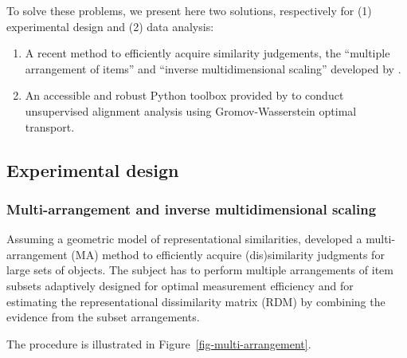 \documentclass[
  authoryear]{elsarticle}
\providecommand{\tightlist}{%
  \setlength{\itemsep}{0pt}\setlength{\parskip}{0pt}}\usepackage{longtable,booktabs,array}
\begin{document}
To solve these problems, we present here two solutions, respectively for
(1) experimental design and (2) data analysis:

\begin{enumerate}
\def\labelenumi{\arabic{enumi}.}
\tightlist
\item
  A recent method to efficiently acquire similarity judgements, the
  ``multiple arrangement of items'' and ``inverse multidimensional
  scaling'' developed by \citet{kriegeskorteInverseMDSInferring2012}.
\item
  An accessible and robust Python toolbox provided by
  \citet{sasakiToolboxGromovWassersteinOptimal2023} to conduct
  unsupervised alignment analysis using Gromov-Wasserstein optimal
  transport.
\end{enumerate}

\subsection{Experimental design}\label{experimental-design}

\subsubsection{Multi-arrangement and inverse multidimensional
scaling}\label{sec-ma}

Assuming a geometric model of representational similarities,
\citet{kriegeskorteInverseMDSInferring2012} developed a
multi-arrangement (MA) method to efficiently acquire (dis)similarity
judgments for large sets of objects. The subject has to perform multiple
arrangements of item subsets adaptively designed for optimal measurement
efficiency and for estimating the representational dissimilarity matrix
(RDM) by combining the evidence from the subset arrangements.

The procedure is illustrated in Figure~\ref{fig-multi-arrangement}.
\end{document}
